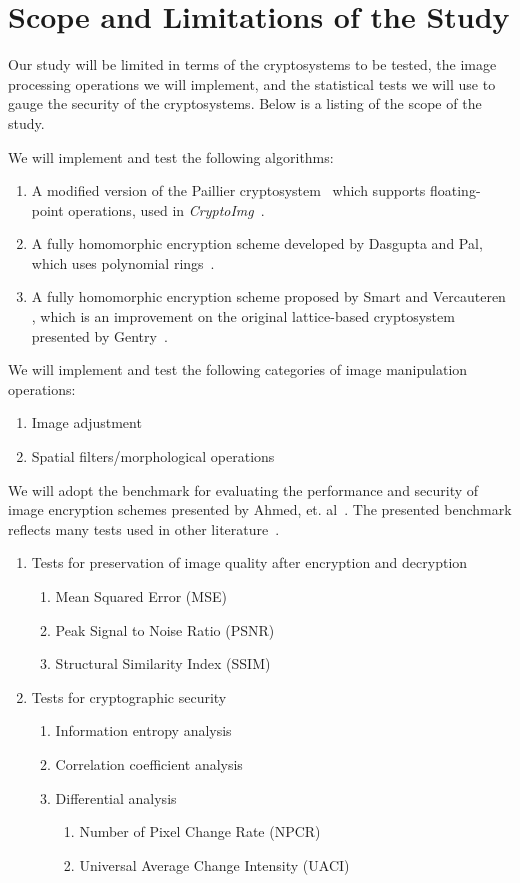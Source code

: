\section{Scope and Limitations of the Study}
Our study will be limited in terms of the cryptosystems to be tested, the image processing operations we will implement, and the statistical tests we will use to gauge the security of the cryptosystems. Below is a listing of the scope of the study.

We will implement and test the following algorithms:
\begin{enumerate}
	\item A modified version of the Paillier cryptosystem~\cite{stern_public-key_1999} which supports floating-point operations, used in \textit{CryptoImg}~\cite{ziad_cryptoimg:_2016}.
	\item A fully homomorphic encryption scheme developed by Dasgupta and Pal, which uses polynomial rings~\cite{dasgupta_design_2016}.
	\item A fully homomorphic encryption scheme proposed by Smart and Vercauteren \cite{hutchison_fully_2010}, which is an improvement on the original lattice-based cryptosystem presented by Gentry~\cite{gentry_fully_2009}.
\end{enumerate}
We will implement and test the following categories of image manipulation operations:
\begin{enumerate}
	\item Image adjustment
	\item Spatial filters/morphological operations
\end{enumerate}
We will adopt the benchmark for evaluating the performance and security of image encryption schemes presented by Ahmed, et. al~\cite{ahmed_benchmark_2016}. The presented benchmark reflects many tests used in other literature~\cite{ahmad_efficiency_2012, wu_npcr_2011}.
\begin{enumerate}
	\item Tests for preservation of image quality after encryption and decryption
	\begin{enumerate}
		\item Mean Squared Error (MSE)
		\item Peak Signal to Noise Ratio (PSNR)
		\item Structural Similarity Index (SSIM)
	\end{enumerate}
	\item Tests for cryptographic security
	\begin{enumerate}
		\item Information entropy analysis
		\item Correlation coefficient analysis
		\item Differential analysis
        \begin{enumerate}
            \item Number of Pixel Change Rate (NPCR)
            \item Universal Average Change Intensity (UACI)
        \end{enumerate}
	\end{enumerate}
\end{enumerate}
